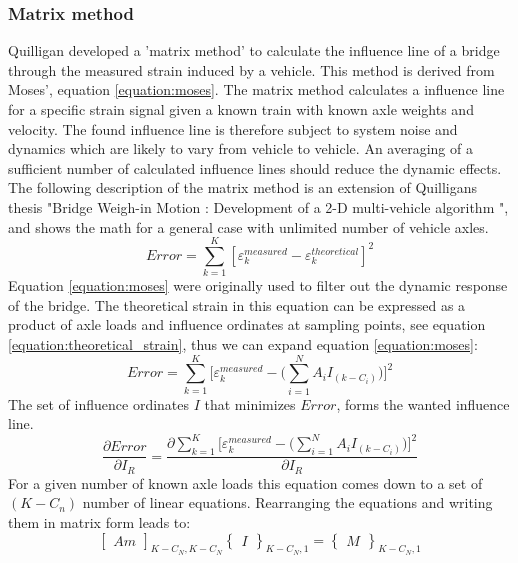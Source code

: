 \subsubsection{Matrix method}
Quilligan \cite{Quilligan} developed a 'matrix method' to calculate the influence line of a bridge through the measured strain induced by a vehicle. This method is derived from Moses', equation \ref{equation:moses}. The matrix method calculates a influence line for a specific strain signal given a known train with known axle weights and velocity. The found influence line is therefore subject to system noise and dynamics which are likely to vary from vehicle to vehicle. An averaging of a sufficient number of calculated influence lines should reduce the dynamic effects. The following description of the matrix method is an extension of Quilligans thesis "Bridge Weigh-in Motion : Development of a 2-D multi-vehicle algorithm \cite{Quilligan}", and shows the math for a general case with unlimited number of vehicle axles.
\begin{equation}
Error = \sum_{k = 1}^{K} [\varepsilon_{k}^{measured} - \varepsilon_{k}^{theoretical}]^2
\label{equation:moses}
\end{equation}
Equation \ref{equation:moses} were originally used to filter out the dynamic response of the bridge.
The theoretical strain in this equation can be expressed as a product of axle loads and influence ordinates at sampling points, see equation \ref{equation:theoretical_strain}, thus we can expand equation \ref{equation:moses}:
\begin{equation}
Error = \sum_{k = 1}^{K} \Big[\varepsilon_{k}^{measured} - \Big(\sum_{i = 1}^{N} A_i I_{(k-C_i)}\Big)\Big]^2
\label{equation:moses_expanded}
\end{equation}
The set of influence ordinates $I$ that minimizes $Error$, forms the wanted influence line.
\begin{equation}
\frac{\partial Error}{\partial I_R} = \frac{\partial \sum_{k = 1}^{K} \Big[\varepsilon_{k}^{measured} - \Big(\sum_{i = 1}^{N} A_i I_{(k-C_i)}\Big)\Big]^2}{\partial I_R}
\end{equation}
For a given number of known axle loads this equation comes down to a set of $(K - C_n)$ number of linear equations. Rearranging the equations and writing them in matrix form leads to:
\begin{equation}
\begin{bmatrix} Am \end{bmatrix}_{K-C_N, K-C_N} \begin{Bmatrix} I \end{Bmatrix}_{K-C_N, 1} = \begin{Bmatrix} M \end{Bmatrix}_{K-C_N, 1}
\label{equation:matrixForm}
\end{equation}
